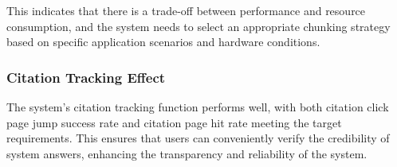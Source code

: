 This indicates that there is a trade-off between performance and resource
consumption, and the system needs to select an appropriate chunking strategy
based on specific application scenarios and hardware conditions.

\subsubsection{Citation Tracking Effect}

The system's citation tracking function performs well, with both citation click
page jump success rate and citation page hit rate meeting the target
requirements. This ensures that users can conveniently verify the credibility
of system answers, enhancing the transparency and reliability of the system.
